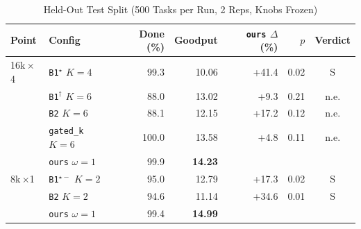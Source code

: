 \documentclass[conference]{IEEEtran}
\newcommand{\x}{$\times$}
\newcommand{\pick}{$^\star$}
\newcommand{\pickf}{$^{\star-}$}
\newcommand{\topk}{$^\dagger$}
\newcommand{\cfg}[1]{\texttt{#1}}
\begin{document}
\begin{table}[t]
  \caption{Held-Out Test Split (500 Tasks per Run, 2 Reps, Knobs Frozen)}
  \label{tab:test}
  \centering
  \scriptsize
  \setlength{\tabcolsep}{3pt}
  \begin{tabular}{@{}llrrrrc@{}}
    \toprule
    Point & Config & Done (\%) & Goodput & \cfg{ours} $\Delta$ (\%) & $p$ & Verdict \\
    \midrule
    16k\,\x4 & \cfg{B1}\pick{} $K{=}4$ & 99.3 & 10.06 & +41.4 & 0.02 & S \\
     & \cfg{B1}\topk{} $K{=}6$ & 88.0 & 13.02 & +9.3 & 0.21 & n.e. \\
     & \cfg{B2} $K{=}6$ & 88.1 & 12.15 & +17.2 & 0.12 & n.e. \\
     & \cfg{gated\_k} $K{=}6$ & 100.0 & 13.58 & +4.8 & 0.11 & n.e. \\
     & \cfg{ours} $\omega{=}1$ & 99.9 & \textbf{14.23} & & & \\
    \midrule
    8k\,\x1 & \cfg{B1}\pickf{} $K{=}2$ & 95.0 & 12.79 & +17.3 & 0.02 & S \\
     & \cfg{B2} $K{=}2$ & 94.6 & 11.14 & +34.6 & 0.01 & S \\
     & \cfg{ours} $\omega{=}1$ & 99.4 & \textbf{14.99} & & & \\
    \bottomrule
  \end{tabular}
\end{table}
\end{document}
